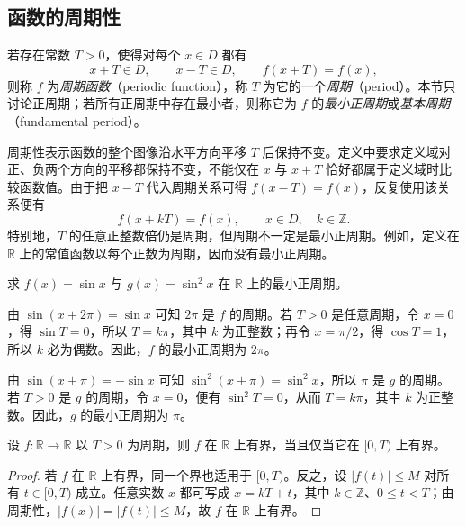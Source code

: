 \documentclass[UTF8,12pt,a4paper,fontset=fandol]{ctexbook}
\begin{document}
\subsection{函数的周期性}
\label{subsec:periodicity-of-functions}

\begin{definition}
\label{def:periodic-functions}
若存在常数 $T>0$，使得对每个 $x\in D$ 都有
\[
    x+T\in D,\qquad x-T\in D,\qquad f(x+T)=f(x),
\]
则称 $f$ 为\emph{周期函数}（periodic function），称 $T$ 为它的一个\emph{周期}（period）。本节只讨论正周期；若所有正周期中存在最小者，则称它为 $f$ 的\emph{最小正周期}或\emph{基本周期}（fundamental period）。
\end{definition}

周期性表示函数的整个图像沿水平方向平移 $T$ 后保持不变。定义中要求定义域对正、负两个方向的平移都保持不变，不能仅在 $x$ 与 $x+T$ 恰好都属于定义域时比较函数值。由于把 $x-T$ 代入周期关系可得 $f(x-T)=f(x)$，反复使用该关系便有
\[
    f(x+kT)=f(x),\qquad x\in D,\quad k\in\mathbb{Z}.
\]
特别地，$T$ 的任意正整数倍仍是周期，但周期不一定是最小正周期。例如，定义在 $\mathbb{R}$ 上的常值函数以每个正数为周期，因而没有最小正周期。

\begin{example}
\label{ex:periods-of-sine-functions}
求 $f(x)=\sin x$ 与 $g(x)=\sin^2 x$ 在 $\mathbb{R}$ 上的最小正周期。
\end{example}

\begin{solve}
由 $\sin(x+2\pi)=\sin x$ 可知 $2\pi$ 是 $f$ 的周期。若 $T>0$ 是任意周期，令 $x=0$，得 $\sin T=0$，所以 $T=k\pi$，其中 $k$ 为正整数；再令 $x=\pi/2$，得 $\cos T=1$，所以 $k$ 必为偶数。因此，$f$ 的最小正周期为 $2\pi$。

由 $\sin(x+\pi)=-\sin x$ 可知 $\sin^2(x+\pi)=\sin^2 x$，所以 $\pi$ 是 $g$ 的周期。若 $T>0$ 是 $g$ 的周期，令 $x=0$，便有 $\sin^2 T=0$，从而 $T=k\pi$，其中 $k$ 为正整数。因此，$g$ 的最小正周期为 $\pi$。
\end{solve}

\begin{proposition}
\label{prop:periodic-function-boundedness}
设 $f:\mathbb{R}\to\mathbb{R}$ 以 $T>0$ 为周期，则 $f$ 在 $\mathbb{R}$ 上有界，当且仅当它在 $[0,T)$ 上有界。
\end{proposition}

\begin{proof}
若 $f$ 在 $\mathbb{R}$ 上有界，同一个界也适用于 $[0,T)$。反之，设 $|f(t)|\leq M$ 对所有 $t\in[0,T)$ 成立。任意实数 $x$ 都可写成 $x=kT+t$，其中 $k\in\mathbb{Z}$、$0\leq t<T$；由周期性，$|f(x)|=|f(t)|\leq M$，故 $f$ 在 $\mathbb{R}$ 上有界。
\end{proof}
\end{document}
